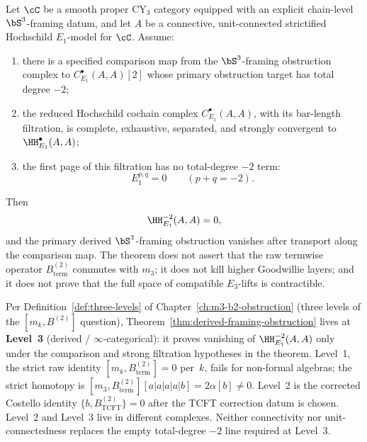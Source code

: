 \begin{theorem}
\label{thm:derived-framing-obstruction}
Let $\cC$ be a smooth proper CY$_3$ category equipped with an explicit
chain-level $\bS^3$-framing datum, and let $A$ be a connective,
unit-connected strictified Hochschild $E_1$-model for $\cC$. Assume:
\begin{enumerate}[label=\textup{(\roman*)}]
 \item there is a specified comparison map from the $\bS^3$-framing
 obstruction complex to $C^\bullet_{E_1}(A,A)[2]$ whose primary
 obstruction target has total degree $-2$;
 \item the reduced Hochschild cochain complex $C^\bullet_{E_1}(A,A)$,
 with its bar-length filtration, is complete, exhaustive, separated, and
 strongly convergent to $\HH^\bullet_{E_1}(A,A)$;
 \item the first page of this filtration has no total-degree $-2$ term:
 \[
  E_1^{p,q}=0\qquad(p+q=-2).
 \]
\end{enumerate}
Then
\[
 \HH^{-2}_{E_1}(A,A)=0,
\]
and the primary derived $\bS^3$-framing obstruction vanishes after
transport along the comparison map. The theorem does not assert that the
raw termwise operator $B^{(2)}_{\mathrm{term}}$ commutes with $m_3$; it
does not kill higher Goodwillie layers; and it does not prove that the
full space of compatible $E_3$-lifts is contractible.
\end{theorem}

\begin{remark}
\label{rem:derived-framing-three-levels}
Per Definition~\ref{def:three-levels} of
Chapter~\ref{ch:m3-b2-obstruction} (three levels of the
$[m_k, B^{(2)}]$ question), Theorem~\ref{thm:derived-framing-obstruction}
lives at \textbf{Level~3} (derived / $\infty$-categorical): it proves
vanishing of $\HH^{-2}_{E_1}(A,A)$ only under the comparison and strong
filtration hypotheses in the theorem. Level~1, the strict raw identity
$[m_k,B^{(2)}_{\mathrm{term}}]=0$ per~$k$, fails for non-formal
algebras; the strict homotopy is
$[m_3,B^{(2)}_{\mathrm{term}}][a|a|a|a|b]=2\alpha[b]\neq0$. Level~2 is
the corrected Costello identity
$\{b,B^{(2)}_{\mathrm{TCFT}}\}=0$ after the TCFT correction datum is
chosen. Level~2 and Level~3 live in different complexes. Neither
connectivity nor unit-connectedness replaces the empty total-degree
$-2$ line required at Level~3.
\end{remark}

